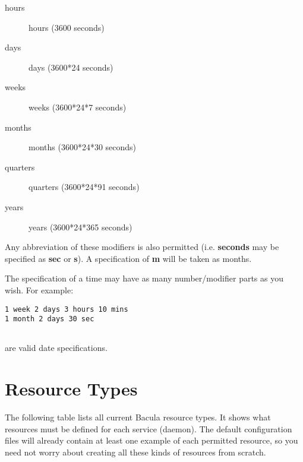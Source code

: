 \begin{description}
\begin{description}
\item [hours]
   hours (3600 seconds)  

\item [days]
   days (3600*24 seconds)  

\item [weeks]
   weeks (3600*24*7 seconds)

\item [months]
   months (3600*24*30 seconds)  

\item [quarters]
   quarters (3600*24*91 seconds)  

\item [years]
   years (3600*24*365 seconds)  
\end{description}

Any abbreviation of these modifiers is also permitted (i.e.  {\bf seconds}
may be specified as {\bf sec} or {\bf s}).  A specification of {\bf m} will
be taken as months.

The specification of a time may have as many number/modifier parts as you
wish.  For example:

\footnotesize
\begin{verbatim}
1 week 2 days 3 hours 10 mins
1 month 2 days 30 sec
   
\end{verbatim}
\normalsize

are valid date specifications.

\end{description}

\label{ResTypes}
\section{Resource Types}

The following table lists all current Bacula resource types. It shows what
resources must be defined for each service (daemon). The default configuration
files will already contain at least one example of each permitted resource, so
you need not worry about creating all these kinds of resources from scratch. 

